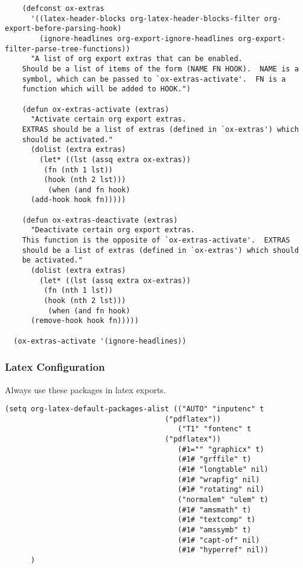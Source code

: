 \documentclass[11pt]{article}
\begin{document}
\begin{verbatim}
    (defconst ox-extras
      '((latex-header-blocks org-latex-header-blocks-filter org-export-before-parsing-hook)
        (ignore-headlines org-export-ignore-headlines org-export-filter-parse-tree-functions))
      "A list of org export extras that can be enabled.
    Should be a list of items of the form (NAME FN HOOK).  NAME is a
    symbol, which can be passed to `ox-extras-activate'.  FN is a
    function which will be added to HOOK.")

    (defun ox-extras-activate (extras)
      "Activate certain org export extras.
    EXTRAS should be a list of extras (defined in `ox-extras') which
    should be activated."
      (dolist (extra extras)
        (let* ((lst (assq extra ox-extras))
         (fn (nth 1 lst))
         (hook (nth 2 lst)))
          (when (and fn hook)
      (add-hook hook fn)))))

    (defun ox-extras-deactivate (extras)
      "Deactivate certain org export extras.
    This function is the opposite of `ox-extras-activate'.  EXTRAS
    should be a list of extras (defined in `ox-extras') which should
    be activated."
      (dolist (extra extras)
        (let* ((lst (assq extra ox-extras))
         (fn (nth 1 lst))
         (hook (nth 2 lst)))
          (when (and fn hook)
      (remove-hook hook fn)))))

  (ox-extras-activate '(ignore-headlines))

\end{verbatim}

\subsubsection{Latex Configuration}
\label{sec:org6ff04e7}
Always use these packages in latex exports.
\begin{verbatim}
(setq org-latex-default-packages-alist (("AUTO" "inputenc" t
                                     ("pdflatex"))
                                        ("T1" "fontenc" t
                                     ("pdflatex"))
                                        (#1="" "graphicx" t)
                                        (#1# "grffile" t)
                                        (#1# "longtable" nil)
                                        (#1# "wrapfig" nil)
                                        (#1# "rotating" nil)
                                        ("normalem" "ulem" t)
                                        (#1# "amsmath" t)
                                        (#1# "textcomp" t)
                                        (#1# "amssymb" t)
                                        (#1# "capt-of" nil)
                                        (#1# "hyperref" nil))
      )

\end{verbatim}
\end{document}
